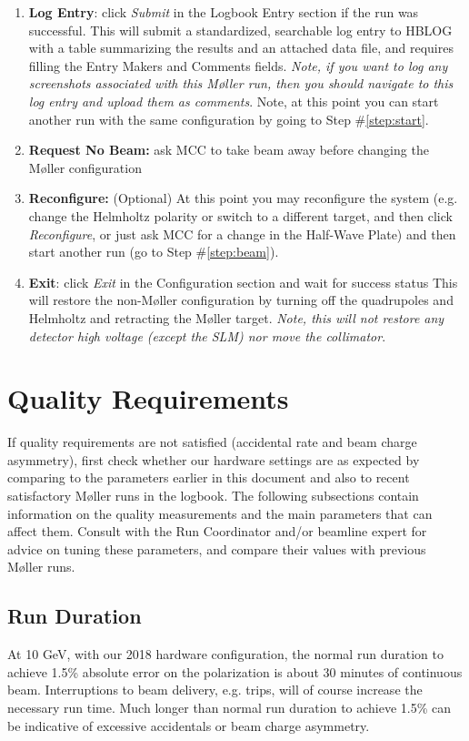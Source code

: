 \documentclass[amsmath,amssymb,notitlepage,12pt]{revtex4}
\begin{document}
\begin{enumerate}
\item {\bf Log Entry}: click {\em Submit} in the Logbook Entry section if the run was successful. 
    \subitem This will submit a standardized, searchable log entry to HBLOG with a table summarizing the results and an attached data file, and requires filling the Entry Makers and Comments fields.  {\em Note, if you want to log any screenshots associated with this M{\o}ller run, then you should navigate to this log entry and upload them as comments}.
    \subitem Note, at this point you can start another run with the same configuration by going to Step \#\ref{step:start}.
\item {\bf Request No Beam:} ask MCC to take beam away before changing the M{\o}ller configuration
\item {\bf Reconfigure:}  (Optional)  At this point you may reconfigure the system (e.g. change the Helmholtz polarity or switch to a different target, and then click {\em Reconfigure}, or just ask MCC for a change in the Half-Wave Plate) and then start another run (go to Step \#\ref{step:beam}).
\item {\bf Exit}: click {\em Exit} in the Configuration section and wait for success status
    \subitem  This will restore the non-M{\o}ller configuration by turning off the quadrupoles and Helmholtz and retracting the M{\o}ller target.  {\em Note, this will not restore any detector high voltage (except the SLM) nor move the collimator}. 
\end{enumerate}

\newpage
\section{Quality Requirements}\label{sec:knobs}

If quality requirements are not satisfied (accidental rate and beam charge asymmetry), first check whether our hardware settings are as expected by comparing to the parameters earlier in this document and also to recent satisfactory M{\o}ller runs in the logbook.  The following subsections contain information on the quality measurements and the main parameters that can affect them.  Consult with the Run Coordinator and/or beamline expert for advice on tuning these parameters, and compare their values with previous M{\o}ller runs.

\subsection{Run Duration}
At 10 GeV, with our 2018 hardware configuration, the normal run duration to achieve 1.5\% absolute error on the polarization is about 30 minutes of continuous beam.  Interruptions to beam delivery, e.g. trips, will of course increase the necessary run time.  Much longer than normal run duration to achieve 1.5\% can be indicative of excessive accidentals or beam charge asymmetry.
\end{document}
